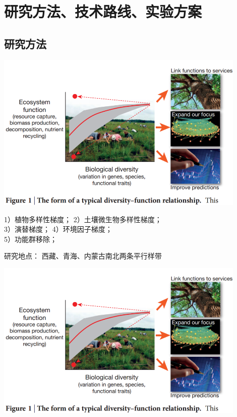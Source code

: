 \section{研究方法、技术路线、实验方案}

\subsection{研究方法}
\begin{frame}{\insertsection}{\insertsubsection}
	\begin{center}
		\includegraphics[width = 0.9\textwidth]{./pic/2.1.png}
	\end{center}
1）植物多样性梯度；
2）土壤微生物多样性梯度；\\
3）演替梯度；
4）环境因子梯度；\\
5）功能群移除；
\end{frame}
\begin{frame}{\insertsection}{\insertsubsection}
研究地点：
西藏、青海、内蒙古南北两条平行样带
	\begin{center}
		\includegraphics[width = 0.9\textwidth]{./pic/2.1.png}
	\end{center}
\end{frame}



